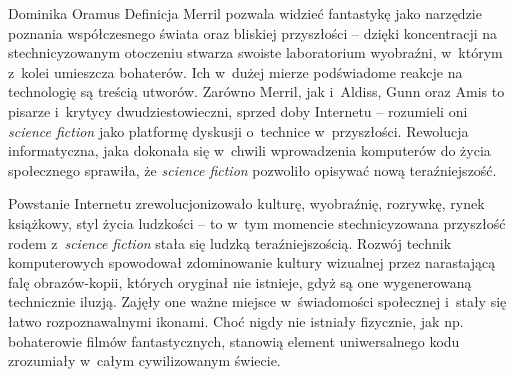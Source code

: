\begin{artplenv}{Dominika Oramus}
Definicja Merril pozwala widzieć fantastykę jako narzędzie poznania współczesnego świata oraz bliskiej przyszłości -- dzięki koncentracji na stechnicyzowanym otoczeniu stwarza swoiste laboratorium wyobraźni, w~którym z~kolei umieszcza bohaterów. Ich w~dużej mierze podświadome reakcje na technologię są treścią utworów. Zarówno Merril, jak i~Aldiss, Gunn oraz Amis to pisarze i~krytycy dwudziestowieczni, sprzed doby Internetu -- rozumieli oni \textit{science fiction} jako platformę dyskusji o~technice w~przyszłości. Rewolucja informatyczna, jaka dokonała się w~chwili wprowadzenia komputerów do życia społecznego sprawiła, że \textit{science fiction} pozwoliło opisywać nową teraźniejszość.

Powstanie Internetu zrewolucjonizowało kulturę, wyobraźnię, rozrywkę, rynek książkowy, styl życia ludzkości -- to w~tym momencie stechnicyzowana przyszłość rodem z~\textit{science fiction} stała się ludzką teraźniejszością. Rozwój technik komputerowych spowodował zdominowanie kultury wizualnej przez narastającą falę obrazów-kopii, których oryginał nie istnieje, gdyż są one wygenerowaną technicznie iluzją. Zajęły one ważne miejsce w~świadomości społecznej i~stały się łatwo rozpoznawalnymi ikonami. Choć nigdy nie istniały fizycznie, jak np. bohaterowie filmów fantastycznych, stanowią element uniwersalnego kodu zrozumiały w~całym cywilizowanym świecie.


\end{artplenv}
